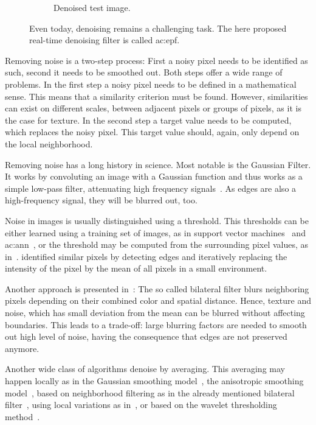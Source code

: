 \begin{figure}
\begin{subfigure}[]{0.475\textwidth}
        \caption{Denoised test image.}
        \label{fig:sensor_introduction_lena_denoised}
	\end{subfigure}
  \caption{Even today, denoising remains a challenging task. The here proposed real-time denoising filter is called \gls{ac:epf}.}
  \label{fig:sensor_introduction_lena}
\end{figure}

Removing noise is a two-step process: First a noisy pixel needs to be identified as such, second it needs to be smoothed out. 
Both steps offer a wide range of problems.
In the first step a noisy pixel needs to be defined in a mathematical sense.
This means that a similarity criterion must be found.
However, similarities can exist on different scales, \ie between adjacent pixels or groups of pixels, as it is the case for texture.
In the second step a target value needs to be computed, which replaces the noisy pixel.
This target value should, again, only depend on the local neighborhood.

Removing noise has a long history in science. 
Most notable is the Gaussian Filter. 
It works by convoluting an image with a Gaussian function and thus works as a simple low-pass filter, attenuating high frequency signals~\cite[p. 257f]{gonzalezwoods2002}. 
As edges are also a high-frequency signal, they will be blurred out, too.

Noise in images is usually distinguished using a threshold. 
This thresholds can be either learned using a training set of images, as in support vector machines~\cite{yang2010svm} and \gls{ac:ann}~\cite{muneyasu1995realization,pandey2016anatomization}, or the threshold may be computed from the surrounding pixel values, as in~\cite{du2011dynamic}. 
\cite{lev1977iterative} identified similar pixels by detecting edges and iteratively replacing the intensity of the pixel by the mean of all pixels in a small environment.

Another approach is presented in~\cite{tomasi1998bilateral}: The so called bilateral filter blurs neighboring pixels depending on their combined color and spatial distance. 
Hence, texture and noise, which has small deviation from the mean can be blurred without affecting boundaries. 
This leads to a trade-off: large blurring factors are needed to smooth out high level of noise, having the consequence that edges are not preserved anymore.

Another wide class of algorithms denoise by averaging. 
This averaging may happen locally as in the Gaussian smoothing model~\cite{lindenbaum1994gabor}, the anisotropic smoothing model~\cite{perona1990scale,alvarez1992image}, based on neighborhood filtering as in the already mentioned bilateral filter~\cite{tomasi1998bilateral}, using local variations as in~\cite{rudin1992nonlinear}, or based on the wavelet thresholding method~\cite{donoho1995noising}.

